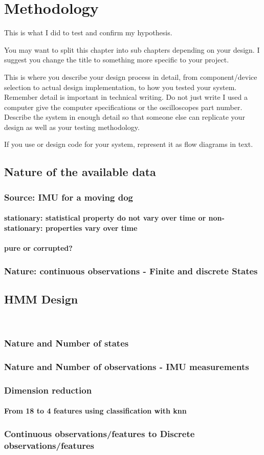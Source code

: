 \chapter{Methodology}

This is what I did to test and confirm my hypothesis.


You may want to split this chapter into sub chapters depending on your design. I suggest you change
the title to something more specific to your project.

This is where you describe your design process in detail, from component/device selection to actual
design implementation, to how you tested your system. Remember detail is important in technical
writing. Do not just write I used a computer give the computer specifications or the oscilloscopes part
number. Describe the system in enough detail so that someone else can replicate your design as well
as your testing methodology.

If you use or design code for your system, represent it as flow diagrams in text.
\section{Nature of the available data}
\subsection{Source: IMU for a moving dog}
\subsubsection{stationary: statistical property do not vary over time or non-stationary: properties vary over time}
\subsubsection{pure or corrupted?}
\subsection{Nature: continuous observations - Finite and discrete States}

\section{HMM Design}
\
\subsection{Nature and Number of states}
\subsection{Nature and Number of observations - IMU measurements}
\subsection{Dimension reduction}
\subsubsection{From 18 to 4 features using classification with knn}
\subsection{Continuous observations/features to Discrete observations/features}